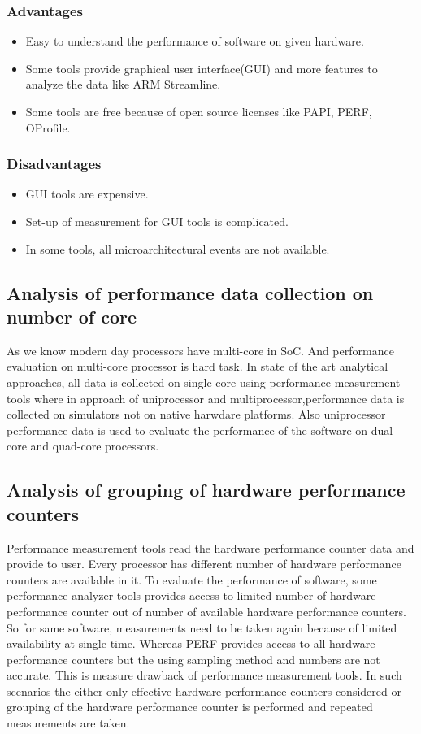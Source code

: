 \subsubsection{Advantages}
\begin{itemize}
   \item Easy to understand the performance of software on given hardware.
   \item Some tools provide graphical user interface(GUI) and more features to analyze the data like ARM Streamline. 
   \item Some tools are free because of open source licenses like PAPI, PERF, OProfile.
\end{itemize}

\subsubsection{Disadvantages}
\begin{itemize}
   \item GUI tools are expensive.
   \item Set-up of measurement for GUI tools is complicated. 
   \item In some tools, all microarchitectural events are not available.
\end{itemize}


\subsection{Analysis of performance data collection on number of core}
As we know modern day processors have multi-core in SoC. And performance evaluation on multi-core processor is hard task. In state of the art analytical approaches, all data is collected on single core using performance measurement tools where in approach of uniprocessor and multiprocessor,performance data is collected on simulators not on native harwdare platforms. Also uniprocessor performance data is used to evaluate the performance of the software on dual-core and quad-core processors.

\subsection{Analysis of grouping of hardware performance counters}
Performance measurement tools read the hardware performance counter data and provide to user. Every processor has different number of hardware performance counters are available in it. To evaluate the performance of software, some performance analyzer tools provides access to limited number of hardware performance counter out of number of available hardware performance counters. So for same software, measurements need to be taken again because of limited availability at single time. Whereas PERF provides access to all hardware performance counters but the using sampling method and numbers are not accurate. This is measure drawback of performance measurement tools. In such scenarios the either only effective hardware performance counters considered or grouping of the hardware performance counter is performed and repeated measurements are taken. 

